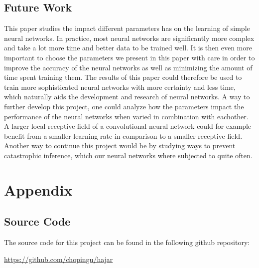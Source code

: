 \documentclass[titlepage]{article}
\begin{document}
\subsection{Future Work}

\vskip 0.2cm

This paper studies the impact different parameters has on the learning of simple neural networks. In practice, most neural networks are significantly more complex and take a lot more time and better data to be trained well. It is then even more important to choose the parameters we present in this paper with care in order to improve the accuracy of the neural networks as well as minimizing the amount of time spent training them. The results of this paper could therefore be used to train more sophisticated neural networks with more certainty and less time, which naturally aids the development and research of neural networks. A way to further develop this project, one could analyze how the parameters impact the performance of the neural networks when varied in combination with eachother. A larger local receptive field of a convolutional neural network could for example benefit from a smaller learning rate in comparison to a smaller receptive field. Another way to continue this project would be by studying ways to prevent catastrophic inference, which our neural networks where subjected to quite often. 

\newpage




\newpage

\appendix

\section{Appendix}
\subsection{Source Code}

\vskip 0.2cm

\centerline{The source code for this project can be found in the following github repository:}

\vskip 0.3cm

\centerline{\href{https://github.com/chopingu/hajar}{https://github.com/chopingu/hajar}}
\end{document}
